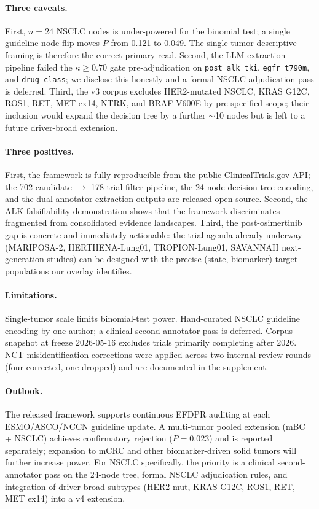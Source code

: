 \documentclass[11pt,a4paper]{article}
\begin{document}
\paragraph{Three caveats.}
First, $n = 24$ NSCLC nodes is under-powered for the binomial test; a single guideline-node flip moves $P$ from 0.121 to 0.049. The single-tumor descriptive framing is therefore the correct primary read. Second, the LLM-extraction pipeline failed the $\kappa \ge 0.70$ gate pre-adjudication on \texttt{post\_alk\_tki}, \texttt{egfr\_t790m}, and \texttt{drug\_class}; we disclose this honestly and a formal NSCLC adjudication pass is deferred. Third, the v3 corpus excludes HER2-mutated NSCLC, KRAS G12C, ROS1, RET, MET ex14, NTRK, and BRAF V600E by pre-specified scope; their inclusion would expand the decision tree by a further $\sim$10 nodes but is left to a future driver-broad extension.

\paragraph{Three positives.}
First, the framework is fully reproducible from the public ClinicalTrials.gov API; the 702-candidate $\to$ 178-trial filter pipeline, the 24-node decision-tree encoding, and the dual-annotator extraction outputs are released open-source. Second, the ALK falsifiability demonstration shows that the framework discriminates fragmented from consolidated evidence landscapes. Third, the post-osimertinib gap is concrete and immediately actionable: the trial agenda already underway (MARIPOSA-2, HERTHENA-Lung01, TROPION-Lung01, SAVANNAH next-generation studies) can be designed with the precise (state, biomarker) target populations our overlay identifies.

\paragraph{Limitations.}
Single-tumor scale limits binomial-test power. Hand-curated NSCLC guideline encoding by one author; a clinical second-annotator pass is deferred. Corpus snapshot at freeze 2026-05-16 excludes trials primarily completing after 2026. NCT-misidentification corrections were applied across two internal review rounds (four corrected, one dropped) and are documented in the supplement.

\paragraph{Outlook.}
The released framework supports continuous EFDPR auditing at each ESMO/ASCO/NCCN guideline update. A multi-tumor pooled extension (mBC + NSCLC) achieves confirmatory rejection ($P = 0.023$) and is reported separately; expansion to mCRC and other biomarker-driven solid tumors will further increase power. For NSCLC specifically, the priority is a clinical second-annotator pass on the 24-node tree, formal NSCLC adjudication rules, and integration of driver-broad subtypes (HER2-mut, KRAS G12C, ROS1, RET, MET ex14) into a v4 extension.
\end{document}
